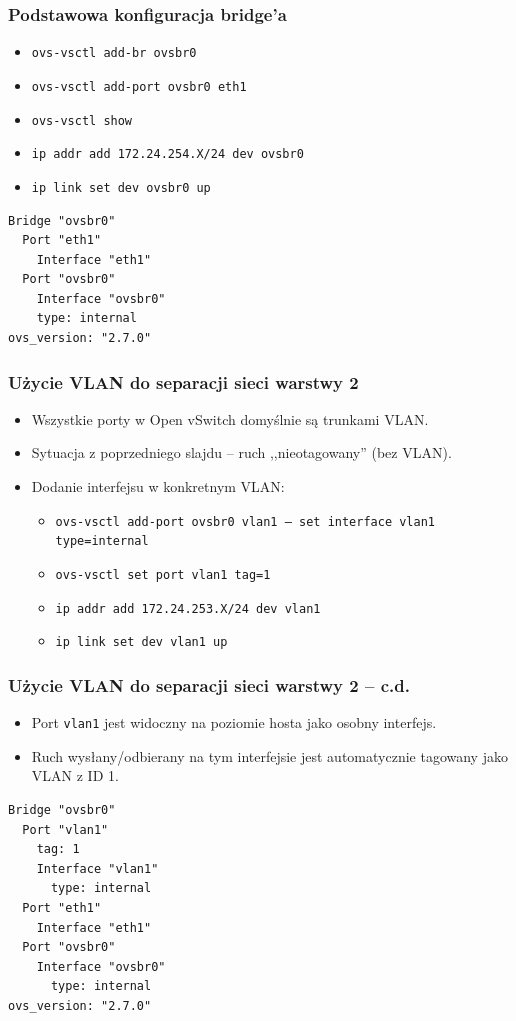 \documentclass[dvipsnames,table]{beamer}
\begin{document}
\begin{frame}[fragile]
\frametitle{Podstawowa konfiguracja bridge'a}
\begin{itemize}
	\item {\tt ovs-vsctl add-br ovsbr0}
	\item {\tt ovs-vsctl add-port ovsbr0 eth1}
	\item {\tt ovs-vsctl show}
	\item {\tt ip addr add 172.24.254.X/24 dev ovsbr0}
	\item {\tt ip link set dev ovsbr0 up}
\end{itemize}
\scriptsize
\begin{verbatim}
Bridge "ovsbr0"
  Port "eth1"
    Interface "eth1"
  Port "ovsbr0"
    Interface "ovsbr0"
    type: internal
ovs_version: "2.7.0"
\end{verbatim}
\end{frame}

\begin{frame}
\frametitle{Użycie VLAN do separacji sieci warstwy 2}
\begin{itemize}
	\item Wszystkie porty w Open vSwitch domyślnie są trunkami VLAN.
	\item Sytuacja z poprzedniego slajdu -- ruch ,,nieotagowany'' (bez VLAN).
	\item Dodanie interfejsu w konkretnym VLAN:
	\begin{itemize}
		\item {\tt ovs-vsctl add-port ovsbr0 vlan1 -- set interface vlan1 type=internal}
		\item {\tt ovs-vsctl set port vlan1 tag=1}
		\item {\tt ip addr add 172.24.253.X/24 dev vlan1}
		\item {\tt ip link set dev vlan1 up}
	\end{itemize}
\end{itemize}
\end{frame}

\begin{frame}[fragile]
\frametitle{Użycie VLAN do separacji sieci warstwy 2 -- c.d.}
\begin{itemize}
	\item Port {\tt vlan1} jest widoczny na poziomie hosta jako osobny interfejs. 
	\item Ruch wysłany/odbierany na tym interfejsie jest automatycznie tagowany jako VLAN z ID 1.
\end{itemize}
\scriptsize
\begin{verbatim}
Bridge "ovsbr0"
  Port "vlan1"
    tag: 1 
    Interface "vlan1"
      type: internal
  Port "eth1"
    Interface "eth1"
  Port "ovsbr0"
    Interface "ovsbr0"
      type: internal
ovs_version: "2.7.0"
\end{verbatim}	
\end{frame}
\end{document}
